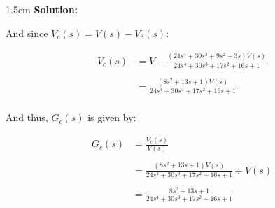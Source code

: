 \documentclass{article}
\newenvironment{solution}{
	\vspace{.5em}
	\par
	\begin{adjustwidth}{1.5em}{}
	\textbf{{Solution:}}
	\par
	\vspace{.5em}
}{
	\vspace{1em}
	\end{adjustwidth}
}
\begin{document}
\begin{solution}
	And since $V_c(s) = V(s) - V_3(s)$:

	\begin{align*}
		V_c(s) &= V - \frac{\left(24s^4 + 30s^3 + 9s^2 + 3s \right)V(s)}{24s^4 + 30s^3 + 17s^2 + 16s + 1} \\\\
			&= \frac{\left(8s^2 + 13s + 1 \right)V(s)}{24s^4 + 30s^3 + 17s^2 + 16s + 1} \\
	\end{align*}

	And thus, $G_c(s)$ is given by:

	\begin{align*}
		G_c(s) &= \frac{V_c(s)}{V(s)} \\\\
			&= \frac{\left(8s^2 + 13s + 1 \right)V(s)}{24s^4 + 30s^3 + 17s^2 + 16s + 1} \div V(s) \\\\
			&= \frac{8s^2 + 13s + 1}{24s^4 + 30s^3 + 17s^2 + 16s + 1} \\\\
	\end{align*}
\end{solution}

\ifdefined\iscombined
	\newpage
\else
	
\end{document}

